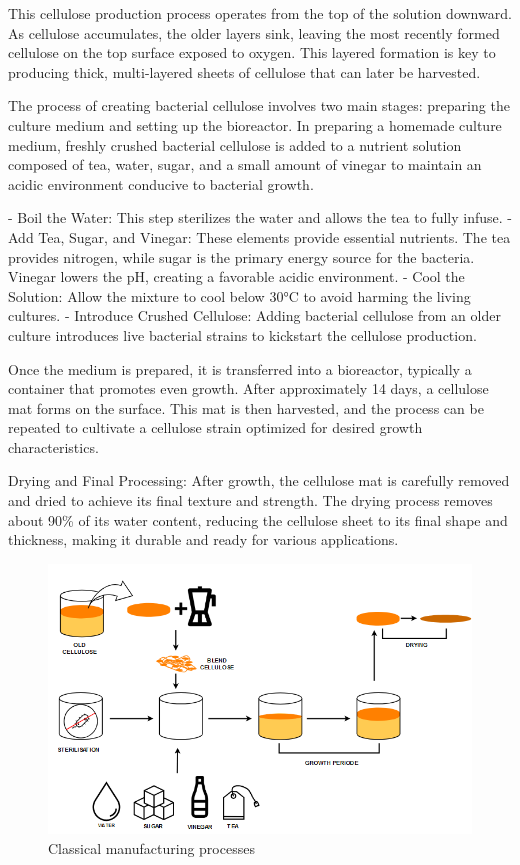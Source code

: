 This cellulose production process operates from the top of the solution downward. As cellulose accumulates, the older layers sink, leaving the most recently formed cellulose on the top surface exposed to oxygen. This layered formation is key to producing thick, multi-layered sheets of cellulose that can later be harvested.

The process of creating bacterial cellulose involves two main stages: preparing the culture medium and setting up the bioreactor. In preparing a homemade culture medium, freshly crushed bacterial cellulose is added to a nutrient solution composed of tea, water, sugar, and a small amount of vinegar to maintain an acidic environment conducive to bacterial growth.

\-- Boil the Water: This step sterilizes the water and allows the tea to fully infuse.
\-- Add Tea, Sugar, and Vinegar: These elements provide essential nutrients. The tea provides nitrogen, while sugar is the primary energy source for the bacteria. Vinegar lowers the pH, creating a favorable acidic environment.
\-- Cool the Solution: Allow the mixture to cool below 30°C to avoid harming the living cultures.
\-- Introduce Crushed Cellulose: Adding bacterial cellulose from an older culture introduces live bacterial strains to kickstart the cellulose production.

Once the medium is prepared, it is transferred into a bioreactor, typically a container that promotes even growth. After approximately 14 days, a cellulose mat forms on the surface. This mat is then harvested, and the process can be repeated to cultivate a cellulose strain optimized for desired growth characteristics.

Drying and Final Processing: After growth, the cellulose mat is carefully removed and dried to achieve its final texture and strength. The drying process removes about 90\% of its water content, reducing the cellulose sheet to its final shape and thickness, making it durable and ready for various applications.


\begin{figure}[h]
    \centering
    \includegraphics[width=1.4\textwidth]{images/SCOBY_diag.png}
    \caption{Classical manufacturing processes}
    \label{fig:manufacture}
\end{figure} 

